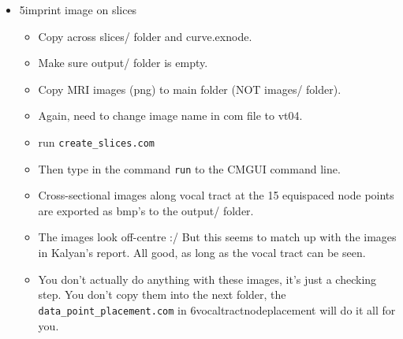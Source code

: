 \documentclass{article}
\begin{document}
\begin{itemize}
\begin{itemize}
        \item 5imprint image on slices
        \begin{itemize}
            \item Copy across slices/ folder and curve.exnode.
            \item Make sure output/ folder is empty.
            \item Copy MRI images (png) to main folder (NOT images/ folder).
            \item Again, need to change image name in com file to vt04.
            \item run \verb|create_slices.com|
            \item Then type in the command \verb|run| to the CMGUI command line.
            \item Cross-sectional images along vocal tract at the 15 equispaced node points are exported as bmp's to the output/ folder.
            \item The images look off-centre :/ But this seems to match up with the images in Kalyan's report. All good, as long as the vocal tract can be seen.
            \item You don't actually do anything with these images, it's just a checking step. You don't copy them into the next folder, the \verb|data_point_placement.com| in 6vocaltractnodeplacement will do it all for you.
        \end{itemize}
        

\end{itemize}
\end{itemize}
\end{document}
